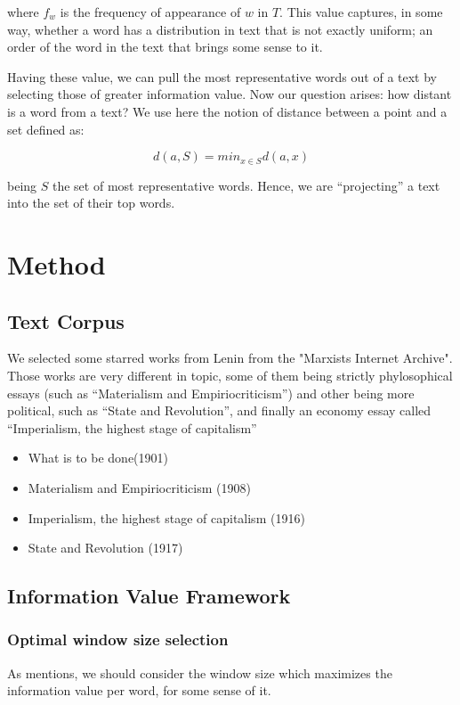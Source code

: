 \documentclass{pnastwo}
\begin{document}
\begin{article}
where $f_w$ is the frequency of appearance of $w$ in $T$. This value captures, in some way, whether a word
has a distribution in text that is not exactly uniform; an order of the word in the text that brings some sense to it.

Having these value, we can pull the most representative words out of a text by selecting those of greater information value. Now our question arises: how distant is a word from a text? We use here the notion of distance between a point and a set defined as:

\begin{equation}
  d(a, S) = min_{x \in S} d(a, x) 
\end{equation}

being $S$ the set of most representative words. Hence, we are ``projecting'' a text into the set of their top words. 



\section{Method}
\subsection{Text Corpus}
We selected some starred works from Lenin from the "Marxists Internet Archive". Those works are very different in topic, some of them being strictly phylosophical essays (such as ``Materialism and Empiriocriticism'') and other being more political, such as ``State and Revolution'', and finally an economy essay called ``Imperialism, the highest stage of capitalism''

\begin{itemize}
  \item What is to be done(1901)
  \item Materialism and Empiriocriticism (1908)
  \item Imperialism, the highest stage of capitalism (1916)
  \item State and Revolution (1917)
\end{itemize}

\subsection{Information Value Framework}
\medskip

\subsubsection{Optimal window size selection}
As \cite{DARWIN} mentions, we should consider the window size which maximizes the information value per word, for some sense of it.


\end{article}
\end{document}
